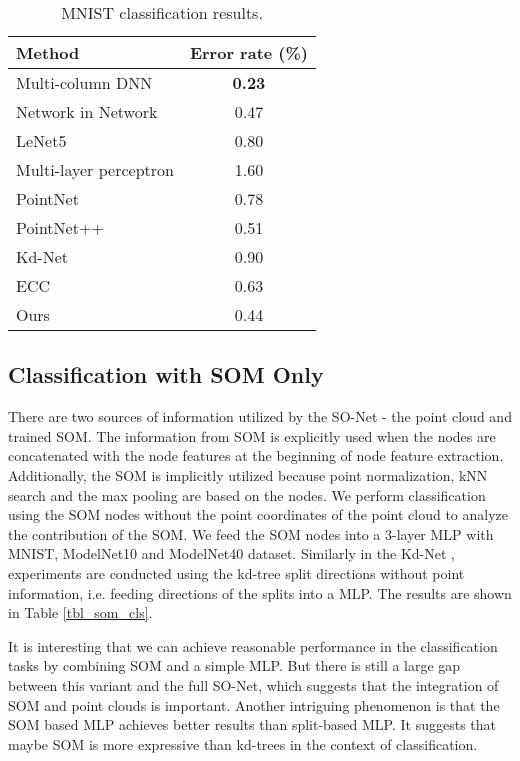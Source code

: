 \documentclass[10pt,twocolumn,letterpaper]{article}
\begin{document}
\begin{table}[h]
\centering
\begin{tabular}{lc}
\hline
Method                 & Error rate (\%) \\ \hline
Multi-column DNN \cite{ciregan2012multi}       & \textbf{0.23}    \\
Network in Network \cite{lin2013network}     & 0.47    \\
LeNet5 \cite{lecun1998gradient}                 & 0.80    \\
Multi-layer perceptron \cite{simard2003best} & 1.60    \\ 
\hline
PointNet \cite{qi2016pointnet}               & 0.78    \\
PointNet++ \cite{qi2017pointnet++}             & 0.51    \\
Kd-Net \cite{klokov2017escape}                 & 0.90    \\
ECC \cite{simonovsky2017dynamic}                    & 0.63    \\ 
\hline
Ours                   & 0.44    \\ 
\hline
\end{tabular}
\caption{MNIST classification results.}
\label{tbl_mnist}
\end{table}\subsection{Classification with SOM Only} 
There are two sources of information utilized by the SO-Net - the point cloud and trained SOM. The information from SOM is explicitly used when the nodes are concatenated with the node features at the beginning of node feature extraction. Additionally, the SOM is implicitly utilized because point normalization, kNN search and the max pooling are based on the nodes.
We perform classification using the SOM nodes without the point coordinates of the point cloud to analyze the contribution of the SOM. 
We feed the SOM nodes into a 3-layer MLP with MNIST, ModelNet10 and ModelNet40 dataset. Similarly in the Kd-Net \cite{klokov2017escape}, experiments are conducted using the kd-tree split directions without point information, i.e. feeding directions of the splits into a MLP. The results are shown in Table \ref{tbl_som_cls}.

It is interesting that we can achieve reasonable performance in the classification tasks by
combining SOM and a simple MLP. But there is still a large gap between this variant and the full SO-Net, which suggests that the integration of SOM and point clouds is important. Another intriguing phenomenon is that the SOM based MLP achieves better results than split-based MLP. It suggests that maybe SOM is more expressive than kd-trees in the context of classification.
\end{document}
